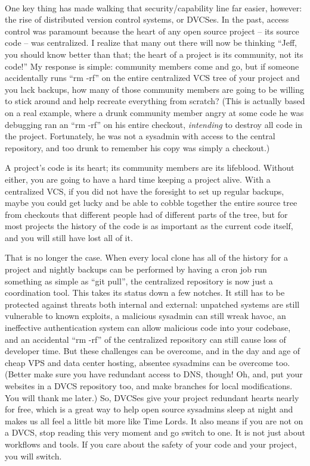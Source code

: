 \paragraph*{}One key thing has made walking that security/capability line far easier,
however: the rise of distributed version control systems, or DVCSes.
In the past, access control was paramount because the heart of any open source
project -- its source code -- was centralized. I realize that many out there
will now be thinking ``Jeff, you should know better than that; the heart of a
project is its community, not its code!'' My response is simple: community
members come and go, but if someone accidentally runs ``rm -rf'' on the entire
centralized VCS tree of your project and you lack backups, how many of those community members are
going to be willing to stick around and help recreate everything from scratch? 
(This is actually based on a real example, where a drunk community member angry at some code he was debugging
ran an ``rm -rf'' on his entire checkout, \emph{intending} to destroy all code
in the project. Fortunately, he was not a sysadmin with access to the central repository, and too drunk
to remember his copy was simply a checkout.)

A project’s code is its heart; its community members are its lifeblood. Without
either, you are going to have a hard time keeping a project alive. With a centralized VCS,
if you did not have the foresight to set up regular backups, maybe you could get lucky and be
able to cobble together the entire source tree from checkouts
that different people had of different parts of the tree, but for most projects the history
of the code is as important as the current code itself, and you will still have
lost all of it.

That is no longer the case. When every local clone has all of the history for a
project and nightly backups can be performed by having a cron job run something as simple
as ``git pull'', the centralized repository is now just a coordination tool. This takes
its status down a few notches. It still has to be protected against threats both
internal and external: unpatched systems are still vulnerable to known exploits,
a malicious sysadmin can still wreak havoc, an ineffective authentication system
can allow malicious code into your codebase, and an accidental ``rm -rf'' of the
centralized repository can still cause loss of developer time. But these
challenges can be overcome, and in the day and age of cheap VPS and data center
hosting, absentee sysadmins can be overcome too. (Better make sure you have
redundant access to DNS, though! Oh, and, put your websites in a DVCS repository
too, and make branches for local modifications. You will thank me later.)
So, DVCSes give your project redundant hearts nearly for free, which is a great
way to help open source sysadmins sleep at night and makes us all feel a little
bit more like Time Lords. It also means if you are not on a DVCS, stop reading
this very moment and go switch to one. It is not just about workflows and tools. If
you care about the safety of your code and your project, you will switch.

